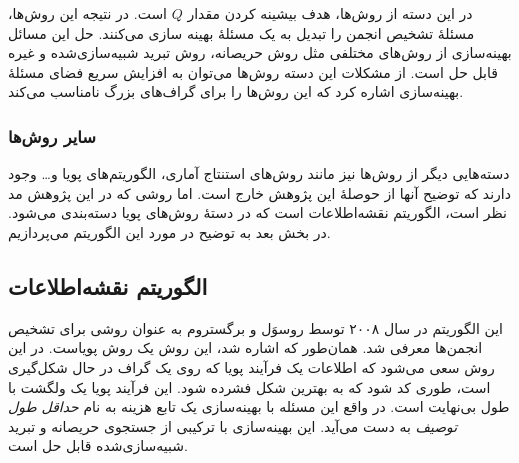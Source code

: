 در این دسته از روش‌ها، هدف بیشینه کردن مقدار $Q$ است. در نتیجه این روش‌ها، مسئلهٔ تشخیص انجمن را تبدیل به یک مسئلهٔ بهینه سازی می‌کنند. حل این مسائل بهینه‌سازی از روش‌های مختلفی مثل روش حریصانه، روش تبرید شبیه‌سازی‌شده و غیره قابل حل است. از مشکلات این دسته روش‌ها می‌توان به افزایش سریع فضای مسئلهٔ بهینه‌سازی اشاره کرد که این روش‌ها را برای گراف‌های بزرگ نامناسب می‌کند.

\subsubsection{سایر روش‌ها}
دسته‌هایی دیگر از روش‌ها نیز مانند روش‌های استنتاج آماری، الگوریتم‌های پویا و… وجود دارند که توضیح آنها از حوصلهٔ این پژوهش خارج است. اما روشی که در این پژوهش مد نظر است، الگوریتم نقشه‌اطلاعات است که در دستهٔ روش‌های پویا دسته‌بندی می‌شود. در بخش بعد به توضیح در مورد این الگوریتم می‌پردازیم.

\subsection{الگوریتم نقشه‌اطلاعات}
این الگوریتم در سال ۲۰۰۸ توسط روسوَل و برگستروم \cite{rosvall2008maps} به عنوان روشی برای تشخیص انجمن‌ها معرفی شد. همان‌طور که اشاره شد، این روش یک روش پویاست. در این روش سعی می‌شود که اطلاعات یک فرآیند پویا که روی یک گراف در حال شکل‌گیری است، طوری کد شود که به بهترین شکل فشرده شود. این فرآیند پویا یک ولگشت با طول بی‌نهایت است. در واقع این مسئله با بهینه‌سازی یک تابع هزینه به نام \textit{حداقل طول توصیف} به دست می‌آید\cite{grunwald2005advances}. این بهینه‌سازی با ترکیبی از جستجوی حریصانه و تبرید شبیه‌سازی‌شده قابل حل است.


